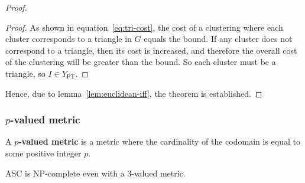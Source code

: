 \begin{proof}
\begin{proof}
    As shown in equation~\eqref{eq:tri-cost}, the cost of a clustering where
    each cluster corresponds to a triangle in $G$ equals the bound.  If any
    cluster does not correspond to a triangle, then its cost is increased, and
    therefore the overall cost of the clustering will be greater than the
    bound.  So each cluster must be a triangle, so $I \in Y_{\text{PT}}$.
  \end{proof}
  Hence, due to lemma~\ref{lem:euclidean-iff}, the theorem is established.
\end{proof}

\subsubsection{$p$-valued metric}
\label{sec:p-valued-metric}

\begin{dfn}
  A \textbf{$p$-valued metric} is a metric where the cardinality of the
  codomain is equal to some positive integer $p$.
\end{dfn}

\begin{thm}
  \label{thm:np-complete-3-val}
  ASC is NP-complete even with a 3-valued metric.
\end{thm}

